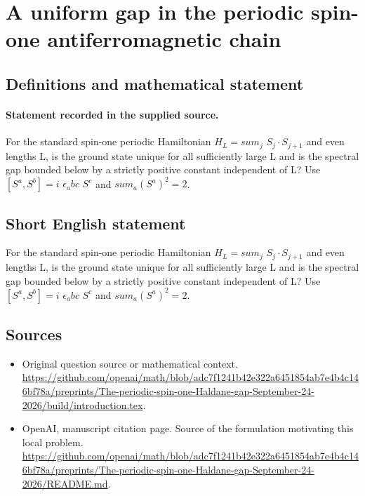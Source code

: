 \documentclass[11pt]{article}
\begin{document}
\section*{A uniform gap in the periodic spin-one antiferromagnetic chain}\label{30007242}
\subsection{Definitions and mathematical statement}
\paragraph{Statement recorded in the supplied source.}
For the standard spin-one periodic Hamiltonian $H_L=sum_j$ $S_j\cdot S_{j+1}$ and even lengths L, is the ground state unique for all sufficiently large L and is the spectral gap bounded below by a strictly positive constant independent of L? Use $[S^a,S^b]=i$ $\epsilon _abc$ $S^c$ and $sum_a(S^a)^2=2$.
\subsection{Short English statement}
For the standard spin-one periodic Hamiltonian $H_L=sum_j$ $S_j\cdot S_{j+1}$ and even lengths L, is the ground state unique for all sufficiently large L and is the spectral gap bounded below by a strictly positive constant independent of L? Use $[S^a,S^b]=i$ $\epsilon _abc$ $S^c$ and $sum_a(S^a)^2=2$.
\subsection{Sources}
\begin{itemize}
\item[S1] Original question source or mathematical context.
\url{https://github.com/openai/math/blob/adc7f1241b42e322a6451854ab7e4b4c146bf78a/preprints/The-periodic-spin-one-Haldane-gap-September-24-2026/build/introduction.tex}.
\item[S2] OpenAI, manuscript citation page. Source of the formulation motivating this local problem.
\url{https://github.com/openai/math/blob/adc7f1241b42e322a6451854ab7e4b4c146bf78a/preprints/The-periodic-spin-one-Haldane-gap-September-24-2026/README.md}.
\end{itemize}
\end{document}
